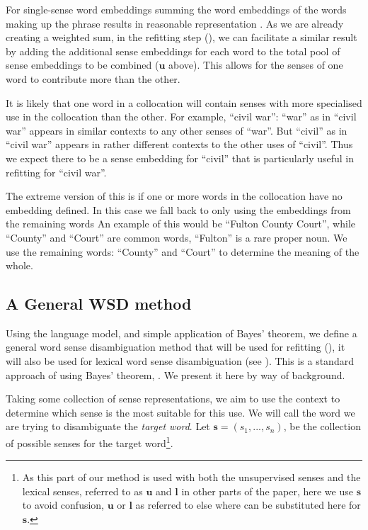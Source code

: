 \documentclass{sig-alternate}
\newcommand{\s}{\mathbf{s}}
\renewcommand{\l}{\mathbf{l}}
\renewcommand{\u}{\mathbf{u}}
\begin{document}
For single-sense word embeddings  summing the word embeddings of the words making up the phrase results in reasonable representation \parencite{mikolovSkip, White2015SentVecMeaning}.
As we are already creating a weighted sum, in the refitting step (), we can facilitate a similar result by adding the additional sense embeddings for each word to the total pool of sense embeddings to be combined ($\u$ above). This allows for the senses of one word to contribute more than the other.

It is likely that one word in a collocation will contain senses with more specialised use in the collocation than the other.
For example, \enquote{civil war}: \enquote{war} as in \enquote{civil war} appears in similar contexts to any other senses of \enquote{war}.
But \enquote{civil} as in \enquote{civil war} appears in rather different contexts to the other uses of \enquote{civil}. Thus we expect there to be a sense embedding for \enquote{civil} that is particularly useful in refitting for \enquote{civil war}.


The extreme version of this is if one or more words in the collocation have no embedding defined. In this case we fall back to only using the embeddings from the remaining words An example of this would be ``Fulton County Court'', while ``County'' and ``Court'' are common words, ``Fulton'' is a rare proper noun. We use the remaining words: ``County'' and ``Court'' to determine the meaning of the whole.



\subsection{A General WSD method} \label{generalwsd}
Using the language model, and simple application of Bayes' theorem, we define a general word sense disambiguation method that will be used for refitting (), it will also be used for lexical word sense disambiguation (see ). This is a standard approach of using Bayes' theorem, \parencite{tian2014probabilistic, AdaGrams}. We present it here by way of background.

Taking some collection of sense representations, we aim to use the context to determine which sense is the most suitable for this use.
We will call the word we are trying to disambiguate the \emph{target word}.
Let $\s=(s_{1},...,s_{n})$, be the collection of possible senses for the target word\footnote{As this part of our method is used with both the unsupervised senses and the lexical senses, referred to as $\u$ and $\l$ in other parts of the paper, here we use $\s$ to avoid confusion, $\u$ or $\l$ as referred to else where can be substituted here for $\s$.}.
\end{document}
